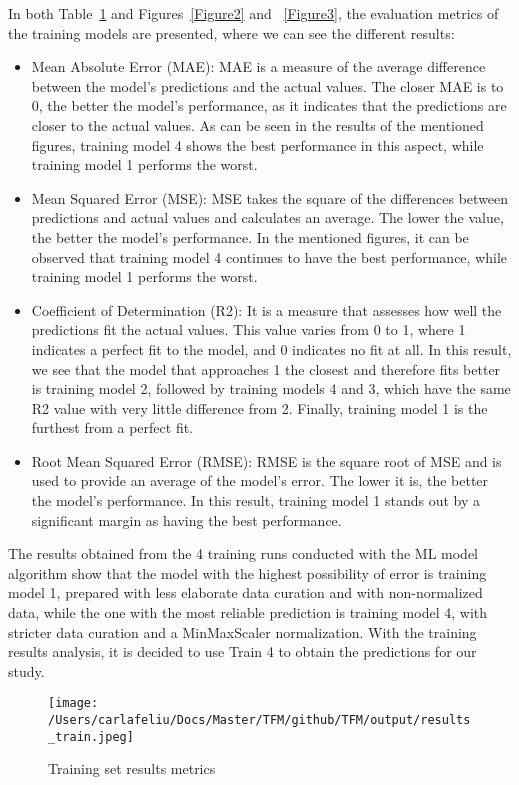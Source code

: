 \documentclass[final,times,twocolumn,article]{elsarticle}
\begin{document}
In both Table~\ref{Figure1} and Figures~\ref{Figure2} and ~\ref{Figure3}, the evaluation metrics of the training models are presented, where we can see the different results: 

\begin{itemize}
\item Mean Absolute Error (MAE): MAE is a measure of the average difference between the model's predictions and the actual values. The closer MAE is to 0, the better the model's performance, as it indicates that the predictions are closer to the actual values. As can be seen in the results of the mentioned figures, training model 4 shows the best performance in this aspect, while training model 1 performs the worst.
\item Mean Squared Error (MSE): MSE takes the square of the differences between predictions and actual values and calculates an average. The lower the value, the better the model's performance. In the mentioned figures, it can be observed that training model 4 continues to have the best performance, while training model 1 performs the worst.
\item Coefficient of Determination (R2): It is a measure that assesses how well the predictions fit the actual values. This value varies from 0 to 1, where 1 indicates a perfect fit to the model, and 0 indicates no fit at all. In this result, we see that the model that approaches 1 the closest and therefore fits better is training model 2, followed by training models 4 and 3, which have the same R2 value with very little difference from 2. Finally, training model 1 is the furthest from a perfect fit.
\item Root Mean Squared Error (RMSE): RMSE is the square root of MSE and is used to provide an average of the model's error. The lower it is, the better the model's performance. In this result, training model 1 stands out by a significant margin as having the best performance.
\end{itemize}

The results obtained from the 4 training runs conducted with the ML model algorithm show that the model with the highest possibility of error is training model 1, prepared with less elaborate data curation and with non-normalized data, while the one with the most reliable prediction is training model 4, with stricter data curation and a MinMaxScaler normalization. With the training results analysis, it is decided to use Train 4 to obtain the predictions for our study. 

\begin{figure}[ht]
    \centering 
     \texttt{[image: /Users/carlafeliu/Docs/Master/TFM/github/TFM/output/results\_train.jpeg]}	
     \caption{Training set results metrics} 
     \label{Figure1}
 \end{figure}
 
\end{document}
